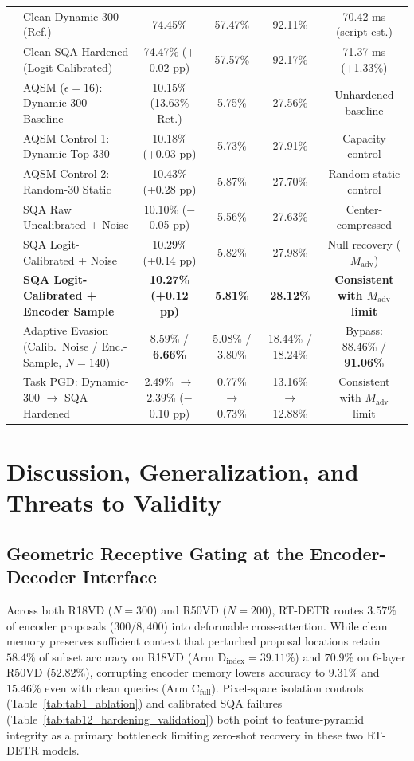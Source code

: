 \documentclass[preprint,10pt]{elsarticle}
\begin{document}
\begin{table}[!htbp]
{{\begin{tabular}{llcccc}
\midrule
{} & Clean Dynamic-300 (Ref.) & 74.45\% & 57.47\% & 92.11\% & 70.42 ms (script est.) \\
& Clean SQA Hardened (Logit-Calibrated) & 74.47\% ($+$0.02 pp) & 57.57\% & 92.17\% & 71.37 ms (+1.33\%) \\
& AQSM ($\epsilon = 16$): Dynamic-300 Baseline & 10.15\% (13.63\% Ret.) & 5.75\% & 27.56\% & Unhardened baseline \\
& AQSM Control 1: Dynamic Top-330 & 10.18\% (+0.03 pp) & 5.73\% & 27.91\% & Capacity control \\
& AQSM Control 2: Random-30 Static & 10.43\% (+0.28 pp) & 5.87\% & 27.70\% & Random static control \\
& SQA Raw Uncalibrated + Noise & 10.10\% ($-$0.05 pp) & 5.56\% & 27.63\% & Center-compressed \\
& SQA Logit-Calibrated + Noise & 10.29\% (+0.14 pp) & 5.82\% & 27.98\% & Null recovery ($M_{\mathrm{adv}}$) \\
& \textbf{SQA Logit-Calibrated + Encoder Sample} & \textbf{10.27\% (+0.12 pp)} & \textbf{5.81\%} & \textbf{28.12\%} & \textbf{Consistent with $M_{\mathrm{adv}}$ limit} \\
& Adaptive Evasion (Calib.\ Noise / Enc.-Sample, $N=140$) & 8.59\% / \textbf{6.66\%} & 5.08\% / 3.80\% & 18.44\% / 18.24\% & Bypass: 88.46\% / \textbf{91.06\%} \\
& Task PGD: Dynamic-300 $\to$ SQA Hardened & 2.49\% $\to$ 2.39\% ($-$0.10 pp) & 0.77\% $\to$ 0.73\% & 13.16\% $\to$ 12.88\% & Consistent with $M_{\mathrm{adv}}$ limit \\
\bottomrule
\end{tabular}%
}}
\end{table}

\section{Discussion, Generalization, and Threats to Validity}
\label{sec:discussion}

\subsection{Geometric Receptive Gating at the Encoder-Decoder Interface}
Across both R18VD ($N=300$) and R50VD ($N=200$), RT-DETR routes $3.57\%$ of encoder proposals ($300 / 8,400$) into deformable cross-attention. While clean memory preserves sufficient context that perturbed proposal locations retain $58.4\%$ of subset accuracy on R18VD ($\text{Arm }\text{D}_{\text{index}} = 39.11\%$) and $70.9\%$ on 6-layer R50VD ($52.82\%$), corrupting encoder memory lowers accuracy to $9.31\%$ and $15.46\%$ even with clean queries ($\text{Arm }\text{C}_{\text{full}}$). Pixel-space isolation controls (Table~\ref{tab:tab1_ablation}) and calibrated SQA failures (Table~\ref{tab:tab12_hardening_validation}) both point to feature-pyramid integrity as a primary bottleneck limiting zero-shot recovery in these two RT-DETR models.
\end{document}
